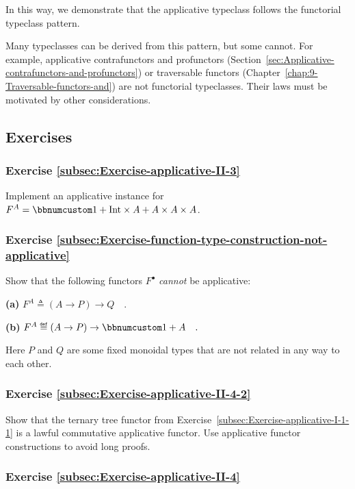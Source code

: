 In this way, we demonstrate that the applicative typeclass follows
the functorial typeclass pattern. 

Many typeclasses can be derived from this pattern, but some cannot.
For example, applicative contrafunctors and profunctors (Section~\ref{sec:Applicative-contrafunctors-and-profunctors})
or traversable functors (Chapter~\ref{chap:9-Traversable-functors-and})
are not functorial typeclasses. Their laws must be motivated by other
considerations.

\subsection{Exercises}

\subsubsection{Exercise \label{subsec:Exercise-applicative-II-3}\ref{subsec:Exercise-applicative-II-3}}

Implement an applicative instance for $F^{A}=\bbnum 1+\text{Int}\times A+A\times A\times A$.

\subsubsection{Exercise \label{subsec:Exercise-function-type-construction-not-applicative}\ref{subsec:Exercise-function-type-construction-not-applicative}}

Show that the following functors $F^{\bullet}$ \emph{cannot} be applicative: 

\textbf{(a)} $F^{A}\triangleq(A\rightarrow P)\rightarrow Q\quad.$

\textbf{(b)} $F^{A}\triangleq\left(A\rightarrow P\right)\rightarrow\bbnum 1+A\quad.$

Here $P$ and $Q$ are some fixed monoidal types that are not related
in any way to each other.

\subsubsection{Exercise \label{subsec:Exercise-applicative-II-4-2}\ref{subsec:Exercise-applicative-II-4-2}}

Show that the ternary tree functor from Exercise~\ref{subsec:Exercise-applicative-I-1-1}
is a lawful commutative applicative functor. Use applicative functor
constructions to avoid long proofs.

\subsubsection{Exercise \label{subsec:Exercise-applicative-II-4}\ref{subsec:Exercise-applicative-II-4}}

